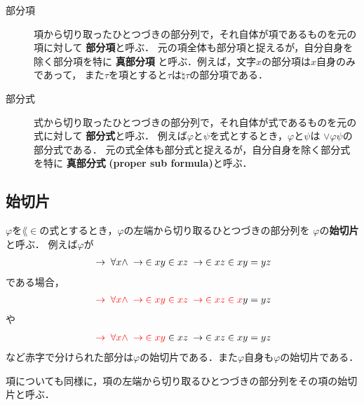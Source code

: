 	\begin{screen}
		\begin{metadfn}\mbox{}
			\begin{description}
				\item[部分項]
					項から切り取ったひとつづきの部分列で，それ自体が項であるものを元の項に対して
					{\bf 部分項}と呼ぶ．
					元の項全体も部分項と捉えるが，自分自身を除く部分項を特に
					{\bf 真部分項}
					と呼ぶ．例えば，文字$x$の部分項は$x$自身のみであって，
					また$\tau$を項とすると$\tau$は$\natural \tau$の部分項である．
		
				\item[部分式]
					式から切り取ったひとつづきの部分列で，それ自体が式であるものを元の式に対して
					{\bf 部分式}と呼ぶ．
					例えば$\varphi$と$\psi$を式とするとき，$\varphi$と$\psi$は
					$\vee \varphi \psi$の部分式である．
					元の式全体も部分式と捉えるが，自分自身を除く部分式を特に
					{\bf 真部分式}
					{\bf (proper sub formula)}と呼ぶ．
			\end{description}
		\end{metadfn}
	\end{screen}
	
\subsection{始切片}
	$\varphi$を$\lang{\in}$の式とするとき，$\varphi$の左端から切り取るひとつづきの部分列を
	$\varphi$の{\bf 始切片}と呼ぶ．
	例えば$\varphi$が
	\begin{align}
		\hspace{0.25em}\rightarrow\hspace{0.25em} \forall x \wedge \hspace{0.25em}\rightarrow\hspace{0.25em} \in xy \in xz \hspace{0.25em}\rightarrow\hspace{0.25em} \in xz \in xy = yz
	\end{align}
	である場合，
	\begin{align}
		\textcolor{red}{\hspace{0.25em}\rightarrow\hspace{0.25em} \forall x \wedge \hspace{0.25em}\rightarrow\hspace{0.25em} \in xy \in xz \hspace{0.25em}\rightarrow\hspace{0.25em} \in xz \in x}y = yz
	\end{align}
	や
	\begin{align}
		\textcolor{red}{\hspace{0.25em}\rightarrow\hspace{0.25em} \forall x \wedge \hspace{0.25em}\rightarrow\hspace{0.25em} \in xy} \in xz \hspace{0.25em}\rightarrow\hspace{0.25em} \in xz \in xy = yz
	\end{align}
	など赤字で分けられた部分は$\varphi$の始切片である．また$\varphi$自身も$\varphi$の始切片である．
	
	項についても同様に，項の左端から切り取るひとつづきの部分列をその項の始切片と呼ぶ．
	
